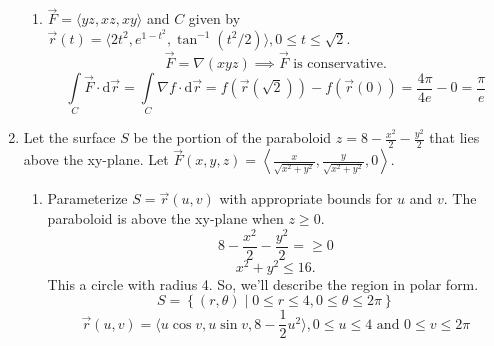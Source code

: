 \begin{enumerate}
\begin{enumerate}[label=\alph*.]
		\item $\vec{F} = \langle yz, xz, xy \rangle$ and $C$ given by $\vec{r}(t) = \langle 2t^2, e^{1-t^2}, \tan^{-1}{(t^2/2)} \rangle, 0 \leq t \leq \sqrt{2}$.
		\begin{equation*}
			\vec{F} = \nabla(xyz) \implies\vec{F} \text{ is conservative.}
		\end{equation*}
		\begin{equation*}
			\int\limits_{C}{\vec{F} \cdot \mathrm{d}\vec{r}} = \int\limits_{C}{\nabla f \cdot \mathrm{d}\vec{r}} = f(\vec{r}(\sqrt{2})) - f(\vec{r}(0)) = \frac{4\pi}{4e} - 0 = \frac{\pi}{e}
		\end{equation*}
	\end{enumerate}
	
	\item Let the surface $S$ be the portion of the paraboloid $z = 8 - \frac{x^2}{2} - \frac{y^2}{2}$ that lies above the xy-plane. Let $\vec{F}(x,y,z) = \left< \frac{x}{\sqrt{x^2 + y^2}}, \frac{y}{\sqrt{x^2 + y^2}}, 0 \right>$.
	\begin{enumerate}[label=\alph*.]
		\item Parameterize $S = \vec{r}(u,v)$ with appropriate bounds for $u$ and $v$.
		The paraboloid is above the xy-plane when $z \geq 0$.
		\begin{equation*}
			8 - \frac{x^2}{2} - \frac{y^2}{2} = \geq 0
		\end{equation*}
		\begin{equation*}
			x^2 + y^2 \leq 16.
		\end{equation*}
		This a circle with radius 4. So, we'll describe the region in polar form.\\
		\begin{equation*}
			S = \left\{ (r,\theta) \mid 0 \leq r \leq 4, 0 \leq \theta \leq 2\pi \right\}
		\end{equation*}
		\begin{equation*}
			\vec{r}(u,v) = \langle u\cos{v}, u\sin{v}, 8 - \frac{1}{2}u^2 \rangle, 0 \leq u \leq 4  \text{ and } 0 \leq v \leq 2\pi
		\end{equation*}
		

\end{enumerate}
\end{enumerate}

